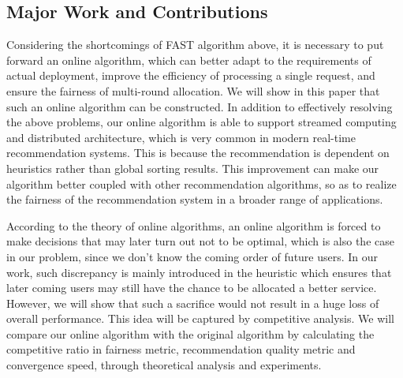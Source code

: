 \subsection{Major Work and Contributions}
Considering the shortcomings of FAST algorithm above, it is necessary to put forward an online algorithm, which can better adapt to the requirements of actual deployment, improve the efficiency of processing a single request, and ensure the fairness of multi-round allocation. We will show in this paper that such an online algorithm can be constructed. In addition to effectively resolving the above problems, our online algorithm is able to support streamed computing and distributed architecture, which is very common in modern real-time recommendation systems\cite{stream_recommendation}. This is because the recommendation is dependent on heuristics rather than global sorting results. This improvement can make our algorithm better coupled with other recommendation algorithms, so as to realize the fairness of the recommendation system in a broader range of applications.

According to the theory of online algorithms\cite{borodin2005online}, an online algorithm is forced to make decisions that may later turn out not to be optimal, which is also the case in our problem, since we don't know the coming order of future users. In our work, such discrepancy is mainly introduced in the heuristic which ensures that later coming users may still have the chance to be allocated a better service. However, we will show that such a sacrifice would not result in a huge loss of overall performance. This idea will be captured by competitive analysis. We will compare our online algorithm with the original algorithm by calculating the competitive ratio in fairness metric, recommendation quality metric and convergence speed, through theoretical analysis and experiments.


